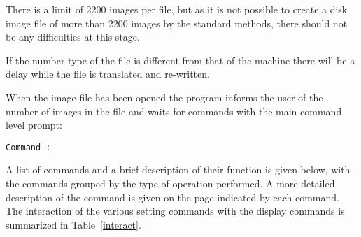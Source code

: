 There is a limit of 2200 images per file, but as it is not possible to
create a disk image file of more than 2200 images by the standard
methods, there should not be any difficulties at this stage.

If the number type of the file is different from that of the machine
there will be a delay while the file is translated and re-written.

When the image file has been opened the program informs the user of the
number of images in the file and waits for commands with the main
command level prompt:
\begin{verbatim}
Command :_
\end{verbatim}

A list of commands and a brief description of their function is given
below, with the commands grouped by the type of operation performed. A
more detailed description of the command is given on the page indicated
by each command.  The interaction of the various setting commands with
the display commands is summarized in Table~\ref{interact}.

